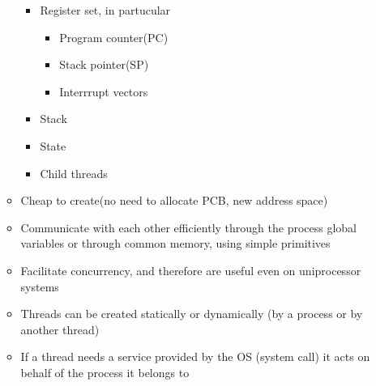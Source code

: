 \documentclass[11pt]{article}
\theoremstyle{definition}
\begin{document}
\begin{itemize}
\begin{itemize}
\begin{itemize}
                        \item Register set, in partucular
                        \begin{itemize}
                            \item Program counter(PC)
                            \item Stack pointer(SP)
                            \item Interrrupt vectors
                        \end{itemize}
                        \item Stack
                        \item State
                        \item Child threads
                    \end{itemize}
                    \item Cheap to create(no need to allocate PCB, new address space)
                    \item Communicate with each other efficiently through the process global variables or through common memory, using simple primitives
                    \item Facilitate concurrency, and therefore are useful even on uniprocessor systems
                    \item Threads can be created statically or dynamically (by a process or by another thread)
                    \item If a thread needs a service provided by the OS (system call) it acts on behalf of the process it belongs to
                    

\end{itemize}
\end{itemize}
\end{document}
